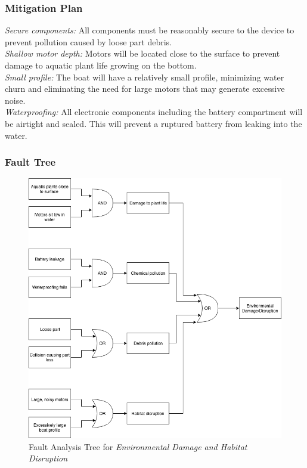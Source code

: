 \documentclass[11pt]{article}
\begin{document}
\subsubsection*{Mitigation Plan}
\textit{Secure components:} All components must be reasonably secure to the device to prevent pollution caused by loose part debris. \\
\textit{Shallow motor depth:} Motors will be located close to the surface to prevent damage to aquatic plant life growing on the bottom. \\
\textit{Small profile:} The boat will have a relatively small profile, minimizing water churn and eliminating the need for large motors that may generate excessive noise. \\
\textit{Waterproofing:} All electronic components including the battery compartment will be airtight and sealed. This will prevent a ruptured battery from leaking into the water.

\subsubsection*{Fault Tree}
\begin{figure}[H]
   \centering
   \includegraphics[width=1\textwidth]{Diagrams/environmental_hazard_fta.png}
   \caption{Fault Analysis Tree for \textit{Environmental Damage and Habitat Disruption}}
   \label{fig:ft-Environment}
\end{figure}
\end{document}
